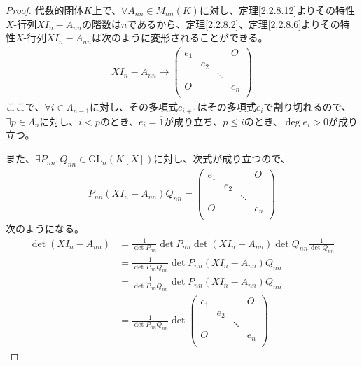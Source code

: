 \documentclass[dvipdfmx]{jsarticle}
\begin{document}
\begin{proof}
代数的閉体$K$上で、$\forall A_{nn} \in M_{nn}(K)$に対し、定理\ref{2.2.8.12}よりその特性$X$-行列$XI_{n} - A_{nn}$の階数は$n$であるから、定理\ref{2.2.8.2}、定理\ref{2.2.8.6}よりその特性$X$-行列$XI_{n} - A_{nn}$は次のように変形されることができる。
\begin{align*}
XI_{n} - A_{nn} \rightarrow \begin{pmatrix}
e_{1} & \  & \  & O \\
\  & e_{2} & \  & \  \\
\  & \  & \ddots & \  \\
O & \  & \  & e_{n} \\
\end{pmatrix}
\end{align*}
ここで、$\forall i \in \varLambda_{n - 1}$に対し、その多項式$e_{i + 1}$はその多項式$e_{i}$で割り切れるので、$\exists p \in \varLambda_{n}$に対し、$i < p$のとき、$e_{i} = \overline{1}$が成り立ち、$p \leq i$のとき、$\deg e_{i} > 0$が成り立つ。\par
また、$\exists P_{nn},Q_{nn} \in {\mathrm{GL}}_{n}\left( K[ X] \right)$に対し、次式が成り立つので、
\begin{align*}
P_{nn}\left( XI_{n} - A_{nn} \right)Q_{nn} = \begin{pmatrix}
e_{1} & \  & \  & O \\
\  & e_{2} & \  & \  \\
\  & \  & \ddots & \  \\
O & \  & \  & e_{n} \\
\end{pmatrix}
\end{align*}
次のようになる。
\begin{align*}
\det\left( XI_{n} - A_{nn} \right) &= \frac{1}{\det{P_{nn}}}\det{P_{nn}}\det\left( XI_{n} - A_{nn} \right)\det{Q_{nn}}\frac{1}{\det{Q_{nn}}}\\
&= \frac{1}{\det{P_{nn}Q_{nn}}}\det{P_{nn}\left( XI_{n} - A_{nn} \right)Q_{nn}}\\
&= \frac{1}{\det{P_{nn}Q_{nn}}}\det{P_{nn}\left( XI_{n} - A_{nn} \right)Q_{nn}}\\
&= \frac{1}{\det{P_{nn}Q_{nn}}}\det\begin{pmatrix}
e_{1} & \  & \  & O \\
\  & e_{2} & \  & \  \\
\  & \  & \ddots & \  \\
O & \  & \  & e_{n} \\
\end{pmatrix}

\end{align*}
\end{proof}
\end{document}
